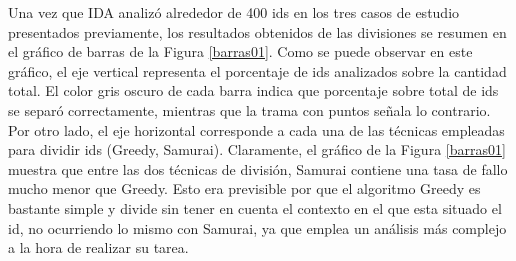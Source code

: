 Una vez que IDA analizó alrededor de 400 ids en los tres casos de estudio presentados previamente, los resultados obtenidos de las divisiones se resumen en el gráfico de barras de la Figura \ref{barras01}. Como se puede observar en este gráfico, el eje vertical representa el porcentaje de ids analizados sobre la cantidad total. El color gris oscuro de cada barra indica que porcentaje sobre total de ids se separó correctamente, mientras que la trama con puntos señala lo contrario. Por otro lado, el eje horizontal corresponde a cada una de las técnicas empleadas para dividir ids (Greedy, Samurai).
Claramente, el gráfico de la Figura \ref{barras01} muestra que entre las dos técnicas de división, Samurai contiene una tasa de fallo mucho menor que Greedy. Esto era previsible por que el algoritmo Greedy es bastante simple y divide sin tener en cuenta el contexto en el que esta situado el id, no ocurriendo lo mismo con Samurai, ya que emplea un análisis más complejo a la hora de realizar su tarea.

